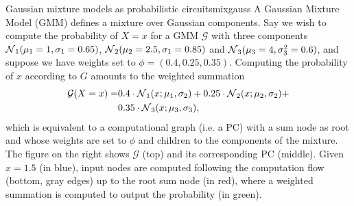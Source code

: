 \newcommand\mone{1}%
\newcommand\sone{0.65}%
\newcommand\mtwo{2.5}%
\newcommand\stwo{0.85}%
\newcommand\mthr{4}%
\newcommand\sthr{0.6}%
\begin{example}[sidebyside,lefthand width=0.55\textwidth]{Gaussian mixture models as probabilistic circuits}{mixgauss}
  A Gaussian Mixture Model (GMM) defines a mixture over Gaussian components. Say we wish to compute
  the probability of $X=x$ for a GMM $\mathcal{G}$ with three components
  $\gaussian_1(\mu_1=\mone,\sigma_1=\sone)$, $\gaussian_2(\mu_2=\mtwo, \sigma_1=\stwo)$ and
  $\gaussian_3(\mu_3=\mthr,\sigma^2_3=\sthr)$, and suppose we have weights set to
  $\phi=(0.4,0.25,0.35)$. Computing the probability of $x$ according to $G$ amounts to the weighted
  summation
  \begin{align*}
    \mathcal{G}(X=x)=&0.4\cdot\operatorname{\mathcal{N}}_1(x;\mu_1,\sigma_2)+0.25\cdot\operatorname{\mathcal{N}}_2(x;\mu_2,\sigma_2)+\\
                     &0.35\cdot\operatorname{\mathcal{N}}_3(x;\mu_3,\sigma_3),
  \end{align*}
  which is equivalent to a computational graph (i.e. a PC) with a sum node as root and whose
  weights are set to $\phi$ and children to the components of the mixture. The figure on the right
  shows $\mathcal{G}$ (top) and its corresponding PC (middle). Given $x=1.5$ (in blue), input nodes
  are computed following the computation flow (bottom, gray edges) up to the root sum node (in
  red), where a weighted summation is computed to output the probability (in green).


\end{example}
